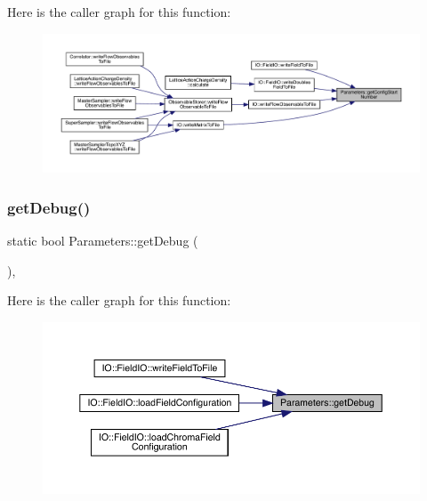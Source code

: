 Here is the caller graph for this function\+:
\nopagebreak
\begin{figure}[H]
\begin{center}
\leavevmode
\includegraphics[width=350pt]{class_parameters_a58f15668b37e705d34d6588e287e4bc0_icgraph}
\end{center}
\end{figure}
\mbox{\label{class_parameters_a265e274127b6d845e43c66d94463f051}} 
\subsubsection{\texorpdfstring{getDebug()}{getDebug()}}
{\footnotesize\ttfamily static bool Parameters\+::get\+Debug (\begin{DoxyParamCaption}{ }\end{DoxyParamCaption})\hspace{0.3cm}{\ttfamily [inline]}, {\ttfamily [static]}}

Here is the caller graph for this function\+:
\nopagebreak
\begin{figure}[H]
\begin{center}
\leavevmode
\includegraphics[width=350pt]{class_parameters_a265e274127b6d845e43c66d94463f051_icgraph}
\end{center}
\end{figure}
\mbox{\label{class_parameters_a9fa8d9376dcba8e98b3fff764e1059d7}} 
